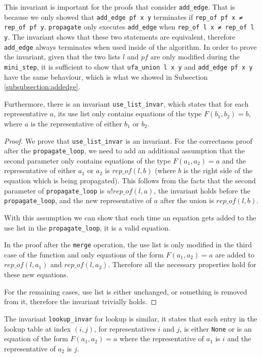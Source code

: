 This invariant is important for the proofs that consider \lstinline{add_edge}. That is because we only showed that \lstinline{add_edge pf x y} terminates if \lstinline{rep_of pf x ≠ rep_of pf y}. \lstinline{propagate} only executes \lstinline{add_edge} when \lstinline{rep_of l x ≠ rep_of l y}. The invariant shows that these two statements are equivalent, therefore \lstinline{add_edge} always terminates when used inside of the algorithm.
In order to prove the invariant, given that the two lists $l$ and $pf$ are only modified during the \lstinline{mini_step}, it is sufficient to show that \lstinline{ufa_union l x y} and \lstinline{add_edge pf x y} have the same behaviour, which is what we showed in Subsection \ref{subsubsection:addedge}.

Furthermore, there is an invariant \lstinline|use_list_invar|, which states that for each representative $a$, its use list only contains equations of the type $F(b_1, b_2) = b$, where $a$ is the representative of either $b_1$ or $b_2$.

\begin{proof}
We prove that \lstinline|use_list_invar| is an invariant.
For the correctness proof after the \lstinline{propagate_loop}, we need to add an additional assumption that the second parameter only contains equations of the type $F(a_1, a_2) = a$ and the representative of either $a_1$ or $a_2$ is $rep\_of(l, b)$ (where $b$ is the right side of the equation which is being propagated). This follows from the facts that the second parameter of \lstinline{propagate_loop} is $u ! rep\_of(l, a)$, the invariant holds before the \lstinline{propagate_loop}, and the new representative of $a$ after the union is $rep\_of(l, b)$.

With this assumption we can show that each time an equation gets added to the use list in the \lstinline{propagate_loop}, it is a valid equation.

In the proof after the \lstinline{merge} operation, the use list is only modified in the third case of the function and only equations of the form $F(a_1, a_2) = a$ are added to $rep\_of(l, a_1)$  and $rep\_of(l, a_2)$. Therefore all the necessary properties hold for these new equations.

For the remaining cases, use list is either unchanged, or something is removed from it, therefore the invariant trivially holds.
\end{proof}

The invariant \lstinline|lookup_invar| for lookup is similar, it states that each entry in the lookup table at index $(i, j)$, for representatives $i$ and $j$, is either \lstinline{None} or is an equation of the form $F(a_1, a_2) = a$ where the representative of $a_1$ is $i$ and the representative of $a_2$ is $j$.

